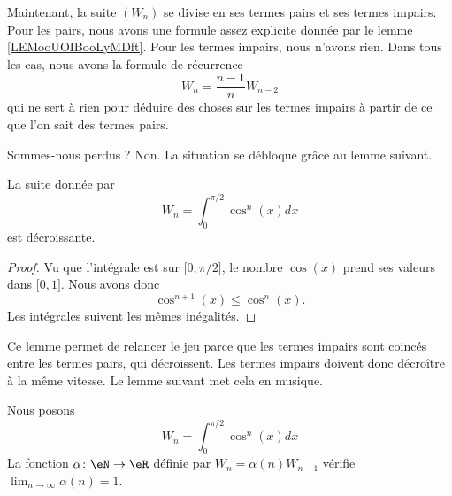 Maintenant, la suite \( (W_n)\) se divise en ses termes pairs et ses termes impairs. Pour les pairs, nous avons une formule assez explicite donnée par le lemme \ref{LEMooUOIBooLyMDft}. Pour les termes impairs, nous n'avons rien. Dans tous les cas, nous avons la formule de récurrence
\begin{equation}
    W_n=\frac{ n-1 }{ n }W_{n-2}
\end{equation}
qui ne sert à rien pour déduire des choses sur les termes impairs à partir de ce que l'on sait des termes pairs.

Sommes-nous perdus ? Non. La situation se débloque grâce au lemme suivant.

\begin{lemma}       \label{LEMooZFBVooQsOuOx}
    La suite donnée par
    \begin{equation}
        W_n=\int_0^{\pi/2}\cos^n(x)dx
    \end{equation}
    est décroissante.
\end{lemma}

\begin{proof}
    Vu que l'intégrale est sur \( \mathopen[ 0 , \pi/2 \mathclose]\), le nombre \( \cos(x)\) prend ses valeurs dans \( \mathopen[ 0 , 1 \mathclose]\). Nous avons donc
    \begin{equation}
        \cos^{n+1}(x)\leq \cos^n(x).
    \end{equation}
    Les intégrales suivent les mêmes inégalités.
\end{proof}

Ce lemme permet de relancer le jeu parce que les termes impairs sont coincés entre les termes pairs, qui décroissent. Les termes impairs doivent donc décroître à la même vitesse. Le lemme suivant met cela en musique.

\begin{lemma}       \label{LEMooAXTEooLBXQuM}
    Nous posons
    \begin{equation}
        W_n=\int_0^{\pi/2}\cos^n(x)dx
    \end{equation}
    La fonction \( \alpha\colon \eN\to \eR\) définie par \( W_n=\alpha(n)W_{n-1}\) vérifie \( \lim_{n\to \infty} \alpha(n)=1\).
\end{lemma}

